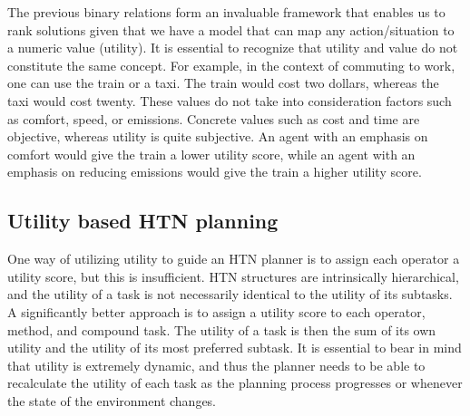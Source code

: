The previous binary relations form an invaluable framework that enables us to rank solutions given that we have a model that can map any action/situation to a numeric value (utility). It is essential to recognize that utility and value do not constitute the same concept. For example, in the context of commuting to work, one can use the train or a taxi. The train would cost two dollars, whereas the taxi would cost twenty. These values do not take into consideration factors such as comfort, speed, or emissions. Concrete values such as cost and time are objective, whereas utility is quite subjective. An agent with an emphasis on comfort would give the train a lower utility score, while an agent with an emphasis on reducing emissions would give the train a higher utility score.


\subsection{Utility based HTN planning}
One way of utilizing utility to guide an HTN planner is to assign each operator a utility score, but this is insufficient. HTN structures are intrinsically hierarchical, and the utility of a task is not necessarily identical to the utility of its subtasks. A significantly better approach is to assign a utility score to each operator, method, and compound task. The utility of a task is then the sum of its own utility and the utility of its most preferred subtask. It is essential to bear in mind that utility is extremely dynamic, and thus the planner needs to be able to recalculate the utility of each task as the planning process progresses or whenever the state of the environment changes.

